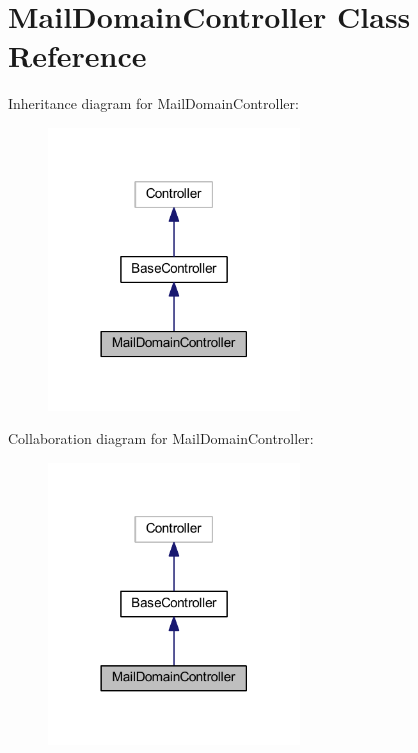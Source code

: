 \hypertarget{class_mail_domain_controller}{}\section{Mail\+Domain\+Controller Class Reference}
\label{class_mail_domain_controller}


Inheritance diagram for Mail\+Domain\+Controller\+:
\nopagebreak
\begin{figure}[H]
\begin{center}
\leavevmode
\includegraphics[width=189pt]{class_mail_domain_controller__inherit__graph}
\end{center}
\end{figure}


Collaboration diagram for Mail\+Domain\+Controller\+:
\nopagebreak
\begin{figure}[H]
\begin{center}
\leavevmode
\includegraphics[width=189pt]{class_mail_domain_controller__coll__graph}
\end{center}
\end{figure}
